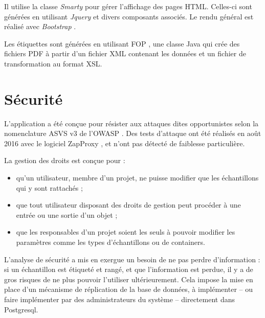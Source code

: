 Il utilise la classe \textit{Smarty} \cite{smarty} pour gérer l'affichage des pages HTML. Celles-ci sont générées en utilisant \textit{Jquery} \cite{jquery}  et divers composants associés. Le rendu général est réalisé avec \textit{Bootstrap} \cite{bootstrap}.

Les étiquettes sont générées en utilisant FOP \cite{fop}, une classe Java qui crée des fichiers PDF à partir d'un fichier XML contenant les données et un fichier de transformation au format XSL.

\section{Sécurité}

L'application a été conçue pour résister aux attaques dites opportunistes selon la nomenclature ASVS v3 \cite{asvs} de l'OWASP \cite{owasp}. Des tests d'attaque ont été réalisés en août 2016 avec le logiciel ZapProxy \cite{zaproxy}, et n'ont pas détecté de faiblesse particulière.

La gestion des droits est conçue pour :
\begin{itemize}
\item qu'un utilisateur, membre d'un projet, ne puisse modifier que les échantillons qui y sont rattachés ;
\item que tout utilisateur disposant des droits de gestion peut procéder à une entrée ou une sortie d'un objet ;
\item que les responsables d'un projet soient les seuls à pouvoir modifier les paramètres comme les types d'échantillons ou de containers.
\end{itemize}
L'analyse de sécurité a mis en exergue un besoin de ne pas perdre d'information : si un échantillon est étiqueté et rangé, et que l'information est perdue, il y a de gros risques de ne plus pouvoir l'utiliser ultérieurement. Cela impose la mise en place d'un mécanisme de réplication de la base de données, à implémenter -- ou faire implémenter par des administrateurs du système -- directement dans Postgresql.


